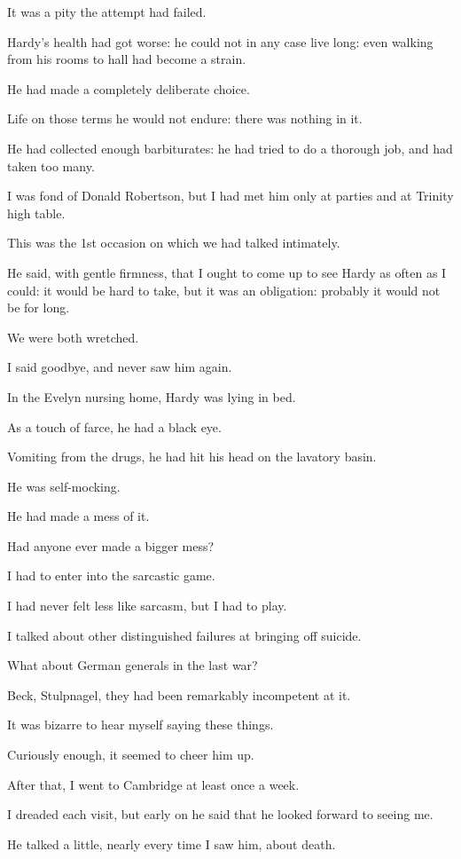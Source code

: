 \documentclass{article}
\numberwithin{equation}{section}
\begin{document}
It was a pity the attempt had failed.

Hardy's health had got worse: he could not in any case live long: even walking from his rooms to hall had become a strain.

He had made a completely deliberate choice.

Life on those terms he would not endure: there was nothing in it.

He had collected enough barbiturates: he had tried to do a thorough job, and had taken too many.

%
I was fond of Donald Robertson, but I had met him only at parties and at Trinity high table.

This was the 1st occasion on which we had talked intimately.

He said, with gentle firmness, that I ought to come up to see Hardy as often as I could: it would be hard to take, but it was an obligation: probably it would not be for long.

We were both wretched.

I said goodbye, and never saw him again.

%
In the Evelyn nursing home, Hardy was lying in bed.

As a touch of farce, he had a black eye.

Vomiting from the drugs, he had hit his head on the lavatory basin.

He was self-mocking.

He had made a mess of it.

Had anyone ever made a bigger mess?

I had to enter into the sarcastic game.

I had never felt less like sarcasm, but I had to play.

I talked about other distinguished failures at bringing off suicide.

What about German generals in the last war?

Beck, Stulpnagel, they had been remarkably incompetent at it.

It was bizarre to hear myself saying these things.

Curiously enough, it seemed to cheer him up.

%
After that, I went to Cambridge at least once a week.

I dreaded each visit, but early on he said that he looked forward to seeing me.

He talked a little, nearly every time I saw him, about death.
\end{document}
